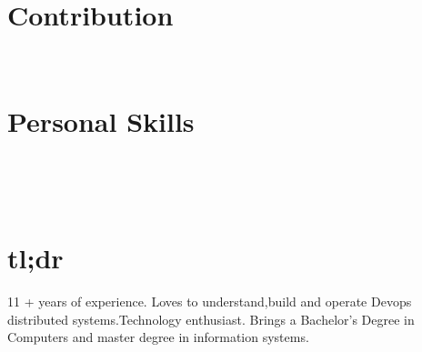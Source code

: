 \documentclass[]{friggeri-cv}
\begin{document}
\begin{aside}
  \section{Contribution}
    ~
  \section{Personal Skills}
    ~
\end{aside}
~

\section{tl;dr}
\begin{entrylist}
  \entry
    {}
    {}
   {}
  {11 + years of experience. Loves to understand,build and operate Devops distributed systems.Technology enthusiast. Brings a Bachelor’s Degree in Computers and master degree in information systems. }
\end{entrylist} 
\end{document}
